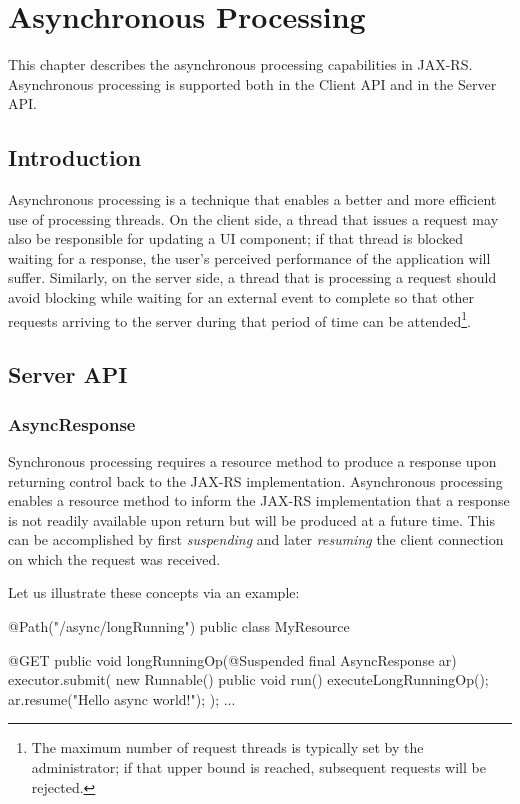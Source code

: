 \chapter{Asynchronous Processing}
\label{asynchronous_processing}

This chapter describes the asynchronous processing capabilities in JAX-RS. Asynchronous processing is supported both in the Client API and in the Server API.

\section{Introduction}
\label{introduction_async}

Asynchronous processing is a technique that enables a better and more efficient use of processing threads. On the client side, a thread that issues a request may also be responsible for updating a UI component; if that thread is blocked waiting for a response, the user's perceived performance of the application will suffer. Similarly, on the server side, a thread that is processing a request should avoid blocking while waiting for an external event to complete so that other requests arriving to the server during that period of time can be attended\footnote{The maximum number of request threads is typically set by the administrator; if that upper bound is reached, subsequent requests will be rejected.}.

\section{Server API}
\label{server_api}

\subsection{AsyncResponse}
\label{async_response}

Synchronous processing requires a resource method to produce a response upon returning control back to the JAX-RS implementation. Asynchronous processing enables a resource method to inform the JAX-RS implementation that a response is not readily available upon return but will be produced at a future time. This can be accomplished by first {\em suspending} and later {\em resuming} the client connection on which the request was received. 

Let us illustrate these concepts via an example:

\begin{listing}{1}
@Path("/async/longRunning")
public class MyResource {
    
    @GET
    public void longRunningOp(@Suspended final AsyncResponse ar) {
        executor.submit(
            new Runnable() {
                public void run() {
                    executeLongRunningOp();
                    ar.resume("Hello async world!");
                } 
            });
    } 
    ...
}
\end{listing}

